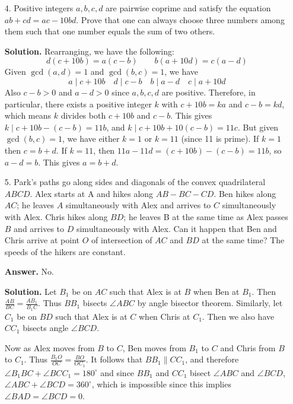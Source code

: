 \documentclass[11pt,a4paper]{article}
\begin{document}
\begin{enumerate}
    \item [4.] 
    Positive integers $a, b, c, d$ are pairwise coprime and satisfy the equation
    $ab + cd = ac - 10bd$.
    Prove that one can always choose three numbers among them such that one
    number equals the sum of two others.
    
    \textbf{Solution.} Rearranging, we have the following: 
    \[
    d(c+10b) = a(c-b)
    \qquad 
    b(a+10d) = c(a-d)
    \]
    Given $\gcd(a, d)=1$ and $\gcd(b, c)=1$, we have 
    \[
    a\mid c+10b\quad d\mid c-b\quad  b\mid a-d\quad c\mid a+10d
    \]
    Also $c-b>0$ and $a-d>0$ since $a, b, c, d$ are positive. 
    Therefore, in particular, there exists a positive integer $k$ with $c+10b=ka$ and $c-b=kd$, 
    which means $k$ divides both $c+10b$ and $c-b$. 
    This gives $k\mid c+10b-(c-b)=11b$, and $k\mid c+10b+10(c-b)=11c$. 
    But given $\gcd(b, c)=1$, we have either $k=1$ or $k=11$ (since 11 is prime). 
    If $k=1$ then $c=b+d$. 
    If $k=11$, then 
    $11a - 11d = (c+10b)-(c-b)=11b$, so $a-d=b$. 
    This gives $a=b+d$. 
	
	\item[5.] Park’s paths go along sides and diagonals of the convex quadrilateral $ABCD$.
	Alex starts at A and hikes along $AB-BC -CD$. 
	Ben hikes along $AC$; 
	he leaves $A$ simultaneously with Alex and arrives to $C$ simultaneously with Alex. 
	Chris hikes along $BD$; he leaves B at the same time as Alex passes $B$ and arrives to
	$D$ simultaneously with Alex. 
	Can it happen that Ben and Chris arrive at point $O$ of intersection of $AC$ and $BD$ at the same time? The speeds of the hikers are constant.
	
	\textbf{Answer.} No. 
	
	\textbf{Solution.} Let $B_1$ be on $AC$ such that Alex is at $B$ when Ben at $B_1$. 
	Then $\frac{AB}{BC} = \frac{AB_1}{B_1C}$. 
	Thus $BB_1$ bisects $\angle ABC$ by angle bisector theorem. 
	Similarly, let $C_1$ be on $BD$ such that Alex is at $C$ when Chris at $C_1$. 
	Then we also have $CC_1$ bisects angle $\angle BCD$. 
	
	Now as Alex moves from $B$ to $C$, 
	Ben moves from $B_1$ to $C$ and Chris from $B$ to $C_1$. 
	Thus $\frac{B_1O}{OC} = \frac{BO}{OC_1}$. 
	It follows that $BB_1\parallel CC_1$, 
	and therefore $\angle B_1BC+\angle BCC_1=180^{\circ}$ and 
	since $BB_1$ and $CC_1$ bisect $\angle ABC$ and $\angle BCD$, 
	$\angle ABC+\angle BCD=360^{\circ}$, 
	which is impossible since this implies $\angle BAD=\angle BCD=0$. 
\end{enumerate}
\end{document}
